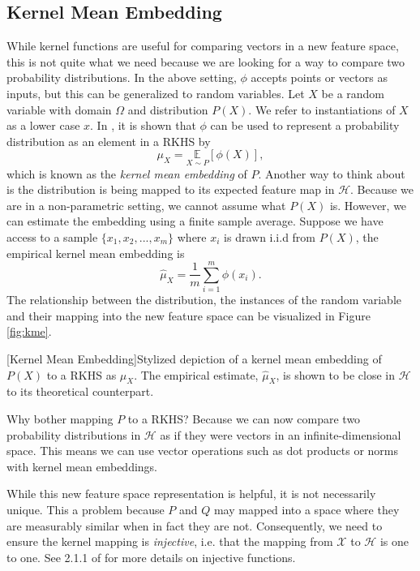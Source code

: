 \subsection{Kernel Mean Embedding}
While kernel functions are useful for comparing vectors in a new feature space, this is not quite what we need because we are looking for a way to compare two probability distributions. In the above setting, $\phi$ accepts points or vectors as inputs, but this can be generalized to random variables. Let $X$ be a random variable with domain $\Omega$ and distribution $P(X)$. We refer to instantiations of $X$ as a lower case $x$. In \cite{smola2007hilbert}, it is shown that $\phi$ can be used to represent a probability distribution as an element in a RKHS by
\begin{equation}
\mu_X =\underset{X \sim P} {\mathbb{E}}[\phi(X)],
\end{equation}
which is known as the \textit{kernel mean embedding} of $P$. Another way to think about is the distribution is being mapped to its expected feature map in $\mathcal{H}$. Because we are in a non-parametric setting, we cannot assume what $P(X)$ is. However, we can estimate the embedding using a finite sample average. Suppose we have access to a sample $\{x_1, x_2, ..., x_m\}$ where $x_i$ is drawn i.i.d from $P(X)$, the empirical kernel mean embedding is 
\begin{equation}
\hat{\mu}_X = \frac{1}{m} \sum_{i=1}^m \phi(x_i).
\end{equation}
The relationship between the distribution, the instances of the random variable and their mapping into the new feature space can be visualized in Figure \ref{fig:kme}.
\begin{center} 
[Kernel Mean Embedding]{Stylized depiction of a kernel mean embedding of $P(X)$ to a RKHS as $\mu_X$. The empirical estimate, $\hat{\mu}_X$, is shown to be close in $\mathcal{H}$ to its theoretical counterpart.} 
\label{fig:kme} 
\end{center}

Why bother mapping $P$ to a RKHS? Because we can now compare two probability distributions in $\mathcal{H}$ as if they were vectors in an infinite-dimensional space. This means we can use vector operations such as dot products or norms with kernel mean embeddings.

While this new feature space representation is helpful, it is not necessarily unique. This a problem because $P$ and $Q$ may mapped into a space where they are measurably similar when in fact they are not. Consequently, we need to ensure the kernel mapping is \textit{injective}, i.e. that the mapping from $\mathcal{X}$ to  $\mathcal{H}$ is one to one. See 2.1.1 of \cite{atkinson2005theoretical} for more details on injective functions.


